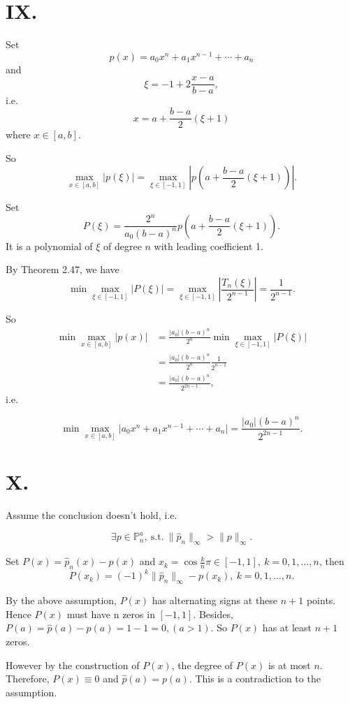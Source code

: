 \documentclass[a4paper]{article}
\begin{document}
\section*{IX.}

Set
$$p(x) = a_{0}x^n + a_{1} x^{n-1} + \cdots + a_n$$ 
and 
$$\xi = -1 + 2\frac{x - a}{b - a},$$ 
i.e.
$$x = a+\frac{b-a}{2}(\xi+1)$$
where $x\in [a, b]$.

So
$$
  \max_{x \in [a,b]} \lvert p(\xi)\rvert = \max_{\xi\in[-1,1]} \left|p\left(a+\frac{b-a}{2}(\xi+1)\right)\right|.
$$

Set
$$
P(\xi) = \frac{2^n}{a_0 ({b-a})^n} p\left(a+\frac{b-a}{2}(\xi+1)\right).
$$
It is a polynomial of $\xi$ of degree $n$ with leading coefficient 1.

By Theorem 2.47, we have
$$
\min \max_{\xi\in[-1,1]} \lvert P(\xi)\rvert = \max_{\xi\in[-1,1]} \left|\frac{T_n(\xi)}{2^{n-1}}\right| = \frac{1}{2^{n-1}}.
$$

So
$$
\begin{aligned}
   \min \max_{x \in [a,b]} |p(x)| &=  \frac{\lvert a_0\rvert ({b-a})^n}{2^n} \min\max_{\xi\in[-1,1]} \lvert P(\xi)\rvert\\
   &= \frac{\lvert a_0\rvert ({b-a})^n}{2^n} \frac{1}{2^{n-1}}  \\
   &= \frac{\lvert a_0\rvert ({b-a})^n}{2^{2n-1}},
\end{aligned}
$$
i.e.

$$
\min\max_{x\in[a,b]}\lvert a_0x^n + a_1 x^{n-1} + \cdots + a_n\rvert = \frac{\lvert a_0\rvert ({b-a})^n}{2^{2n-1}}.
$$

\section*{X.}
Assume the conclusion doesn't hold, i.e.

$$
\exists p \in \mathbb{P}^a_{n},\ \mathrm{s.t.} \ \lVert \hat{p}_{n} \rVert_{\infty} > \lVert p \rVert_{\infty}.
$$

Set $P(x) = \hat{p}_n(x) - p(x)$ and $x_k = \cos \frac{k}{n}\pi\in[-1,1],\ k= 0, 1, \dots, n$, then
$$
P(x_k) = (-1)^{k}\lVert\hat{p}_n \rVert_{\infty} - p(x_k),\ k= 0, 1, \dots, n.
$$

By the above assumption, $P(x)$ has alternating signs at these $n+1$ points. Hence $P(x)$ must have n zeros in $[-1, 1]$.
Besides, $P(a) = \hat{p}(a) - p(a) = 1 - 1 = 0, (a > 1)$. So $P(x)$ has at least $n+1$ zeros. 

However by the construction of $P(x)$, the degree of $P(x)$ is at most $n$. Therefore, $P(x)\equiv0$ and $\hat{p}(a) = p(a)$.
This is a contradiction to the assumption.
\end{document}
